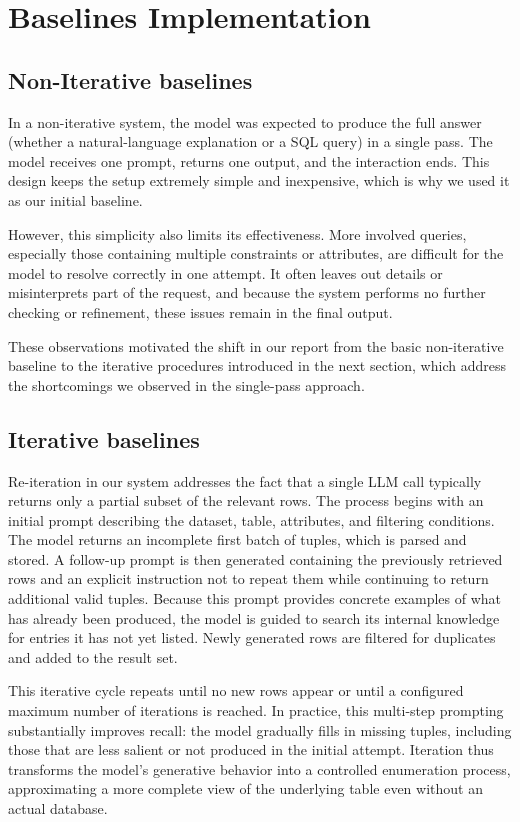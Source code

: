 \documentclass[12pt]{article}
\begin{document}
\section{Baselines Implementation}

\subsection{Non-Iterative baselines}

In a non-iterative system, the model was expected to produce the full answer (whether a natural-language explanation or a SQL query) in a single pass. The model receives one prompt, returns one output, and the interaction ends. This design keeps the setup extremely simple and inexpensive, which is why we used it as our initial baseline.

However, this simplicity also limits its effectiveness. More involved queries, especially those containing multiple constraints or attributes, are difficult for the model to resolve correctly in one attempt. It often leaves out details or misinterprets part of the request, and because the system performs no further checking or refinement, these issues remain in the final output.

These observations motivated the shift in our report from the basic non-iterative baseline to the iterative procedures introduced in the next section, which address the shortcomings we observed in the single-pass approach.


\subsection{Iterative baselines}

Re-iteration in our system addresses the fact that a single LLM call typically returns only a partial subset of the relevant rows. The process begins with an initial prompt describing the dataset, table, attributes, and filtering conditions. The model returns an incomplete first batch of tuples, which is parsed and stored. A follow-up prompt is then generated containing the previously retrieved rows and an explicit instruction not to repeat them while continuing to return additional valid tuples. Because this prompt provides concrete examples of what has already been produced, the model is guided to search its internal knowledge for entries it has not yet listed. Newly generated rows are filtered for duplicates and added to the result set.

This iterative cycle repeats until no new rows appear or until a configured maximum number of iterations is reached. In practice, this multi-step prompting substantially improves recall: the model gradually fills in missing tuples, including those that are less salient or not produced in the initial attempt. Iteration thus transforms the model’s generative behavior into a controlled enumeration process, approximating a more complete view of the underlying table even without an actual database.
\end{document}
